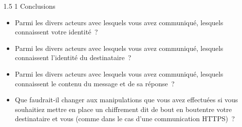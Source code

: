 \documentclass[a4paper,twoside,french]{article}
\makeatletter
\renewcommand\section{\@startsection
  {section}{1}{1cm}%
  {1.5\baselineskip}%
  {1\baselineskip}%
  {\normalfont\Large\bfseries}}%
\makeatother
\begin{document}
  \section{Conclusions}

  \begin{itemize}
  \item Parmi les divers acteurs avec lesquels vous avez communiqué,
    lesquels connaissent votre identité~?
  \item Parmi les divers acteurs avec lesquels vous avez communiqué,
    lesquels connaissent l'identité du destinataire~?
  \item Parmi les divers acteurs avec lesquels vous avez communiqué,
    lesquels connaissent le contenu du message et de sa réponse~?
  \item Que faudrait-il changer aux manipulations que vous avez
    effectuées si vous souhaitiez mettre en place un chiffrement dit
    \og de bout en bout\fg entre votre destinataire et vous (comme
    dans le cas d'une communication HTTPS)~?
  \end{itemize}

  
		
\end{document}
